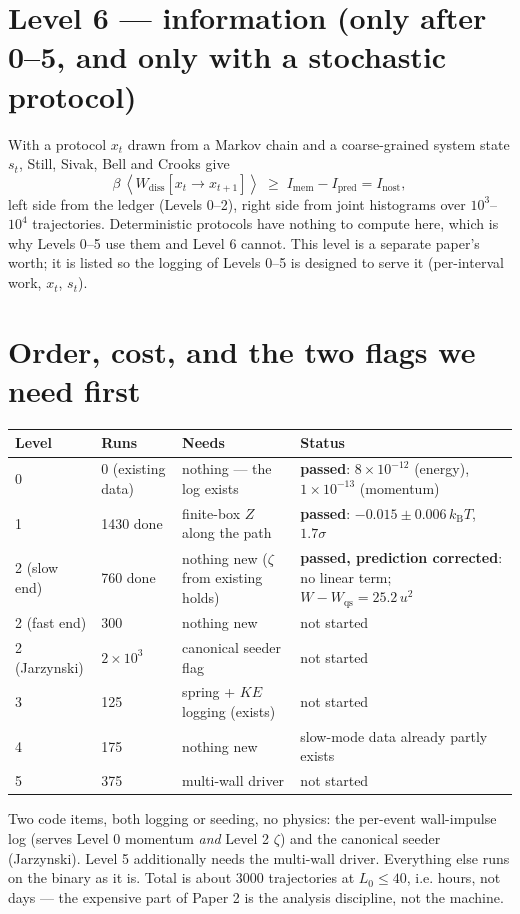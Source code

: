 \documentclass[11pt,a4paper]{article}
\newcommand{\kT}{k_{\mathrm B}T}
\newcommand{\avg}[1]{\left\langle #1 \right\rangle}
\begin{document}
\section{Level 6 --- information (only after 0--5, and only with a stochastic protocol)}
With a protocol $x_t$ drawn from a Markov chain and a coarse-grained system state $s_t$, Still, Sivak, Bell and Crooks give
\begin{equation}
\beta\,\avg{W_{\mathrm{diss}}[x_t \to x_{t+1}]} \;\ge\; I_{\mathrm{mem}} - I_{\mathrm{pred}} = I_{\mathrm{nost}},
\label{eq:still}
\end{equation}
left side from the ledger (Levels 0--2), right side from joint histograms over $10^3$--$10^4$ trajectories. Deterministic protocols have nothing to compute here, which is why Levels 0--5 use them and Level 6 cannot. This level is a separate paper's worth; it is listed so the logging of Levels 0--5 is designed to serve it (per-interval work, $x_t$, $s_t$).

\section{Order, cost, and the two flags we need first}
\begin{center}
\footnotesize
\begin{tabular}{@{}llll@{}}
\toprule
Level & Runs & Needs & Status \\
\midrule
0 & 0 (existing data) & nothing --- the log exists & \textbf{passed}: $8\times10^{-12}$ (energy), $1\times10^{-13}$ (momentum) \\
1 & 1430 done & finite-box $Z$ along the path & \textbf{passed}: $-0.015 \pm 0.006\,\kT$, $1.7\sigma$ \\
2 (slow end) & 760 done & nothing new ($\zeta$ from existing holds) & \textbf{passed, prediction corrected}: no linear term; $W - W_{\mathrm{qs}} = 25.2\,u^2$ \\
2 (fast end) & 300 & nothing new & not started \\
2 (Jarzynski) & $2\times10^3$ & canonical seeder flag & not started \\
3 & 125 & spring + $KE$ logging (exists) & not started \\
4 & 175 & nothing new & slow-mode data already partly exists \\
5 & 375 & multi-wall driver & not started \\
\bottomrule
\end{tabular}
\end{center}
Two code items, both logging or seeding, no physics: the per-event wall-impulse log (serves Level 0 momentum \emph{and} Level 2 $\zeta$) and the canonical seeder (Jarzynski). Level 5 additionally needs the multi-wall driver. Everything else runs on the binary as it is. Total is about 3000 trajectories at $L_0 \le 40$, i.e. hours, not days --- the expensive part of Paper 2 is the analysis discipline, not the machine.
\end{document}
